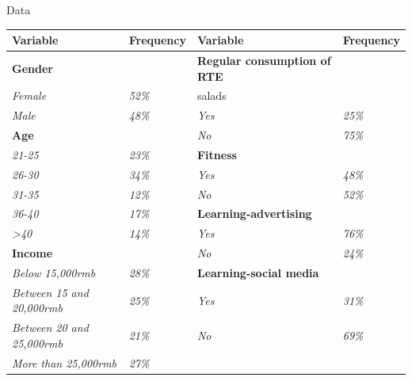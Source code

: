 \documentclass[12pt]{beamer}
\begin{document}


\begin{frame}{Data}
	\scriptsize
	\begin{table}[H]
		\begin{tabular}{l|l|l|l}
			\hline
			\textbf{Variable}                 & \textbf{Frequency} & \textbf{Variable}                              & \textbf{Frequency} \\ \hline
			\textbf{Gender}                   & \textit{}          & \textbf{Regular consumption of RTE}            & \textit{}          \\ \hline
			\textit{Female}                   & \textit{52\%}      & salads                                         & \textit{}          \\ \hline
			\textit{Male}                     & \textit{48\%}      & \textit{Yes}                                   & \textit{25\%}      \\ \hline
			\textbf{Age}                      & \textit{}          & \textit{No}                                    & \textit{75\%}      \\ \hline
			\textit{21-25}                    & \textit{23\%}      & \textbf{Fitness}                               & \textit{}          \\ \hline
			\textit{26-30}                    & \textit{34\%}      & \textit{Yes}                                   & \textit{48\%}      \\ \hline
			\textit{31-35}                    & \textit{12\%}      & \textit{No}                                    & \textit{52\%}      \\ \hline
			\textit{36-40}                    & \textit{17\%}      & \textbf{Learning-advertising}        &                    \\ \hline
			\textit{\textgreater{}40}         & \textit{14\%}      & \textit{Yes}                                   & \textit{76\%}      \\ \hline
			\textbf{Income}                   & \textit{}          & \textit{No}                                    & \textit{24\%}      \\ \hline
			\textit{Below 15,000rmb}          & \textit{28\%}      & \textbf{Learning-social media}       &                    \\ \hline
			\textit{Between 15 and 20,000rmb} & \textit{25\%}      & \textit{Yes}                                   & \textit{31\%}      \\ \hline
			\textit{Between 20 and 25,000rmb} & \textit{21\%}      & \textit{No}                                    & \textit{69\%}      \\ \hline
			\textit{More than 25,000rmb}      & \textit{27\%}      & \textbf{}       & \textit{}          \\ \hline
					

\end{tabular}
\end{table}
\end{frame}
\end{document}
